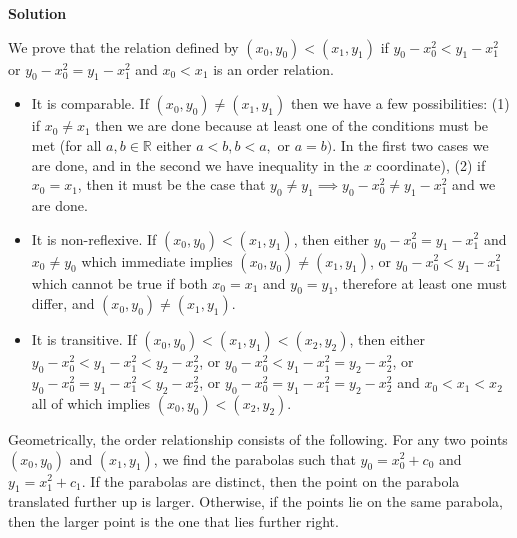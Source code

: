 \documentclass[12pt]{article}
\newcounter{AnswerCounter}
\newcounter{SubAnswerCounter}
\newenvironment{answer}[0]{
  \setcounter{SubAnswerCounter}{1}
  \bigskip
  \textbf{Solution \arabic{AnswerCounter}}
  \\
  \begin{small}
}{
  \end{small}
  \stepcounter{AnswerCounter}
}
\begin{document}
\begin{answer}
We prove that the relation defined by $(x_0,y_0) < (x_1,y_1)$ if $y_0 - x_0^2 < y_1 - x_1^2$ or $y_0 - x_0^2 = y_1 - x_1^2$ and $x_0 < x_1$ is an order relation.
\begin{itemize}
\item It is comparable. If $(x_0,y_0) \neq (x_1,y_1)$ then we have a few possibilities: (1) if $x_0 \neq x_1$ then we are done because at least one of the conditions must be met (for all $a,b \in \mathbb{R}$ either $a < b, b < a,$ or $a = b)$. In the first two cases we are done, and in the second we have inequality in the $x$ coordinate), (2) if $x_0 = x_1$, then it must be the case that $y_0 \neq y_1 \implies y_0 - x_0^2 \neq y_1 - x_1^2$ and we are done.
\item It is non-reflexive. If $(x_0,y_0) < (x_1,y_1)$, then either $y_0 - x_0^2 = y_1 - x_1^2$ and $x_0 \neq y_0$ which immediate implies $(x_0,y_0) \neq (x_1,y_1)$, or $y_0 - x_0^2 < y_1 -x_1^2$ which cannot be true if both $x_0 = x_1$ and $y_0 = y_1$, therefore at least one must differ, and $(x_0,y_0) \neq (x_1, y_1)$.
\item It is transitive. If $(x_0,y_0) < (x_1,y_1) < (x_2,y_2)$, then either $y_0 - x_0^2 < y_1 - x_1^2 < y_2 - x_2^2$, or $y_0 - x_0^2 < y_1 - x_1^2 = y_2 - x_2^2$, or $y_0 - x_0^2 = y_1 - x_1^2 < y_2 - x_2^2$, or $y_0 - x_0^2 = y_1 - x_1^2 = y_2 - x_2^2$ and $x_0 < x_1 < x_2$ all of which implies $(x_0,y_0) < (x_2,y_2)$.
\end{itemize}
Geometrically, the order relationship consists of the following. For any two points $(x_0,y_0)$ and $(x_1,y_1)$, we find the parabolas such that $y_0 = x_0^2 + c_0$ and $y_1 = x_1^2 + c_1$. If the parabolas are distinct, then the point on the parabola translated further up is larger. Otherwise, if the points lie on the same parabola, then the larger point is the one that lies further right.
\end{answer}\\
\end{document}
